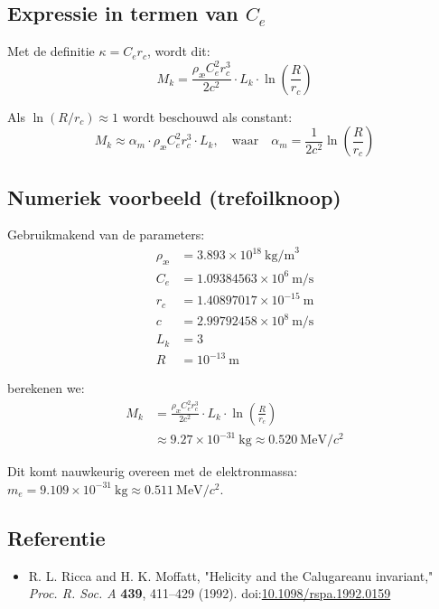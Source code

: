 \subsection{Expressie in termen van \( C_e \)}
Met de definitie \( \kappa = C_e r_c \), wordt dit:
\begin{equation}
    M_k = \frac{\rho_\text{\ae} C_e^2 r_c^3}{2 c^2} \cdot L_k \cdot \ln\left( \frac{R}{r_c} \right)
\end{equation}

Als \( \ln(R/r_c) \approx 1 \) wordt beschouwd als constant:
\begin{equation}
    M_k \approx \alpha_m \cdot \rho_\text{\ae} C_e^2 r_c^3 \cdot L_k, \quad \text{waar} \quad \alpha_m = \frac{1}{2c^2} \ln\left( \frac{R}{r_c} \right)
\end{equation}

\subsection*{Numeriek voorbeeld (trefoilknoop)}
Gebruikmakend van de parameters:
\begin{align*}
    \rho_\text{\ae} &= 3.893 \times 10^{18}~\text{kg/m}^3 \\
    C_e &= 1.09384563 \times 10^6~\text{m/s} \\
    r_c &= 1.40897017 \times 10^{-15}~\text{m} \\
    c &= 2.99792458 \times 10^8~\text{m/s} \\
    L_k &= 3 \\
    R &= 10^{-13}~\text{m}
\end{align*}

berekenen we:
\begin{align*}
    M_k &= \frac{\rho_\text{\ae} C_e^2 r_c^3}{2 c^2} \cdot L_k \cdot \ln\left( \frac{R}{r_c} \right) \\
    &\approx 9.27 \times 10^{-31}~\text{kg} \approx 0.520~\text{MeV}/c^2
\end{align*}

Dit komt nauwkeurig overeen met de elektronmassa: \( m_e = 9.109 \times 10^{-31}~\text{kg} \approx 0.511~\text{MeV}/c^2 \).

\subsection*{Referentie}
\begin{itemize}
    \item R. L. Ricca and H. K. Moffatt, "Helicity and the Calugareanu invariant," \textit{Proc. R. Soc. A} \textbf{439}, 411--429 (1992). doi:\href{https://doi.org/10.1098/rspa.1992.0159}{10.1098/rspa.1992.0159}
\end{itemize}
